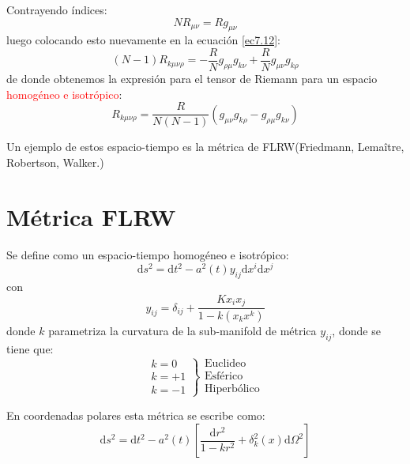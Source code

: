 \documentclass[../main]{subfiles}
\begin{document}
\begin{adjustwidth}{0pt}{-100pt}
Contrayendo índices:
\begin{equation}
    NR_{\mu\nu}=Rg_{\mu\nu}
\end{equation}
luego colocando esto nuevamente en la ecuación \eqref{ec7.12}:
\begin{equation}
    (N-1)R_{k\mu\nu\rho}=-\dfrac{R}{N}g_{\rho\mu}g_{k\nu}+\dfrac{R}{N}g_{\mu\nu}g_{k\rho}
\end{equation}
de donde obtenemos la expresión para el tensor de Riemann para un espacio \textcolor{red}{homogéneo e isotrópico}:
\begin{equation}
    R_{k\mu\nu\rho}=\dfrac{R}{N(N-1)}(g_{\mu\nu}g_{k\rho}-g_{\rho\mu}g_{k\nu})
\end{equation}

Un ejemplo de estos espacio-tiempo es la métrica de FLRW(Friedmann, Lemaître, Robertson, Walker.)

\section{Métrica FLRW}\label{part7.2}

Se define como un espacio-tiempo homogéneo e isotrópico:
\begin{equation}
    \mathrm{d}s^2=\mathrm{d}t^2-a^2(t)y_{ij}\mathrm{d}x^{i}\mathrm{d}x^j
\end{equation}
con 
\begin{equation}
    y_{ij}=\delta_{ij}+\dfrac{K x_i x_j}{1-k(x_k x^k)}
\end{equation}
donde $k$ parametriza la curvatura de la sub-manifold de métrica $y_{ij}$, donde se tiene que:
\begin{equation}
    \left.
    \begin{array}{c}
        k=0\\
        k=+1\\
        k=-1
    \end{array}
    \right\}
    \begin{array}{c}
        \text{Euclideo}\\
        \text{Esférico}\\
        \text{Hiperbólico}
    \end{array}
\end{equation}

En coordenadas polares esta métrica se escribe como:
\begin{equation}
    \mathrm{d}s^2=\mathrm{d}t^2-a^2(t)\left[\dfrac{\mathrm{d}r^2}{1-kr^2}+\delta^2_k(x)\mathrm{d}\Omega^2\right]
\end{equation}


\end{adjustwidth}
\end{document}
